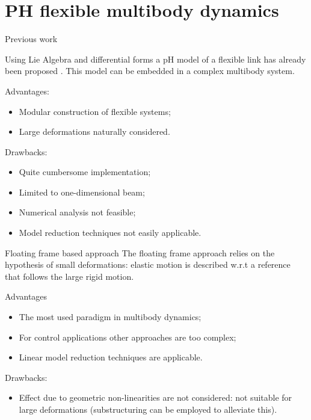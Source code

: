 \documentclass[aspectratio=169]{ISAE-Beamer}
\begin{document}
\section{PH flexible multibody dynamics}

\begin{frame}{Previous work}

Using Lie Algebra and differential forms a pH model of a flexible link has already been proposed . This model can be embedded in a complex multibody system. \\

\begin{overlayarea}{\textwidth}{0.55\textheight}
	\setlength{\abovedisplayskip}{1pt}
	\setlength{\belowdisplayskip}{1pt}
	Advantages:
	\begin{itemize}
		\item {Modular construction of flexible systems;}
		\item {Large deformations naturally considered.}
	\end{itemize}
	Drawbacks:
	\begin{itemize}
		\item {Quite cumbersome implementation;}
		\item {Limited to one-dimensional beam;}
		\item {Numerical analysis not feasible;}
		\item {Model reduction techniques not easily applicable.} 
	\end{itemize}
\end{overlayarea}
\end{frame}

\begin{frame}{Floating frame based approach}
The floating frame approach relies on the hypothesis of small deformations: elastic motion is described w.r.t a reference that follows the large rigid motion. \\
\begin{overlayarea}{\textwidth}{0.5\textheight}
	Advantages 
	\begin{itemize}
		\item {The most used paradigm in multibody dynamics;}
		\item {For control applications other approaches are too complex;}
		\item {Linear model reduction techniques are applicable.} 
	\end{itemize}
	Drawbacks:
	\begin{itemize}
		\item {Effect due to geometric non-linearities are not considered: not suitable for large deformations (substructuring can be employed to alleviate this).}
	\end{itemize}
\end{overlayarea}
\end{frame}
\end{document}
